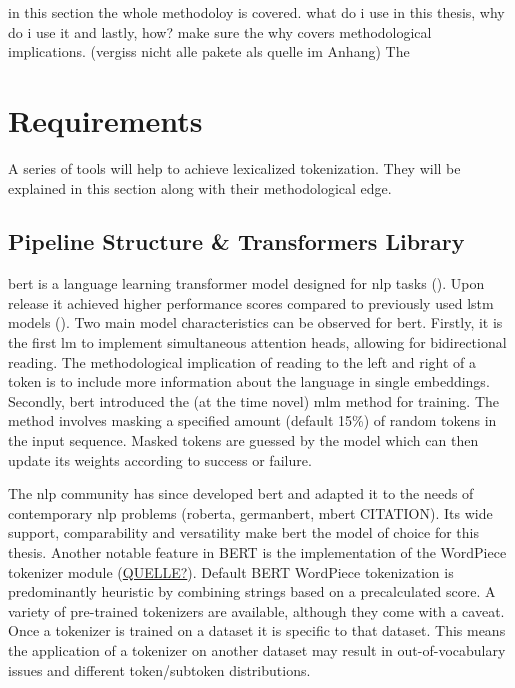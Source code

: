 in this section the whole methodoloy is covered.
what do i use in this thesis, why do i use it and lastly, how?
make sure the why covers methodological implications.
(vergiss nicht alle pakete als quelle im Anhang)
The

\section{Requirements}
\label{sec:requirements}
A series of tools will help to achieve lexicalized tokenization.
They will be explained in this section along with their methodological edge.

\subsection{Pipeline Structure \& Transformers Library}
\label{subsec:architecture}

\ac{bert} is a language learning transformer model designed for \ac{nlp} tasks (\cite{ATTENTION}).
Upon release it achieved higher performance scores compared to previously used \ac{lstm} models (\cite{BERTHIGH1}).
Two main model characteristics can be observed for \ac{bert}.
Firstly, it is the first \ac{lm} to implement simultaneous attention heads, allowing for bidirectional reading.
The methodological implication of reading to the left and right of a token is to include more information about the language in single embeddings.
Secondly, \ac{bert} introduced the (at the time novel) \ac{mlm} method for training.
The method involves masking a specified amount (default 15\%) of random tokens in the input sequence.
Masked tokens are guessed by the model which can then update its weights according to success or failure.

The \ac{nlp} community has since developed \ac{bert} and adapted it to the needs of contemporary \ac{nlp} problems (roberta, germanbert, mbert \uppercase{citation}).
Its wide support, comparability and versatility make \ac{bert} the model of choice for this thesis.
Another notable feature in \uppercase{bert} is the implementation of the WordPiece tokenizer module (\uppercase{\href{https://huggingface.co/course/chapter6/6?fw=pt}{quelle?}}).
Default BERT WordPiece tokenization is predominantly heuristic by combining strings based on a precalculated score.
A variety of pre-trained tokenizers are available, although they come with a caveat.
Once a tokenizer is trained on a dataset it is specific to that dataset.
This means the application of a tokenizer on another dataset may result in out-of-vocabulary issues and different token/subtoken distributions.

